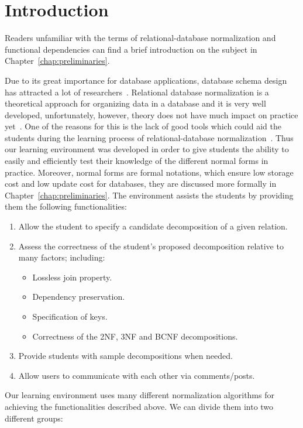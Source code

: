 \chapter{Introduction}
\label{chap:introduction}
Readers unfamiliar with the terms of relational-database normalization and 
functional dependencies can find a brief introduction on the subject in
Chapter~\ref{chap:preliminaries}. 

Due to its great importance for database applications, database schema design has
attracted a lot of researchers~\cite{p1}. Relational database normalization is a 
theoretical approach for organizing data in a database and it is very well developed, 
unfortunately, however, theory does not have much impact on practice yet~\cite{p1}.
One of the reasons for this is the lack of good tools which could aid the students 
during the learning process of relational-database normalization~\cite{p8}. 
Thus our learning environment was developed in order to give students the ability to 
easily and efficiently test
their knowledge of the different normal forms in practice. Moreover, normal forms are formal
notations, which ensure low storage cost and low update cost for databases, they are discussed
more formally in Chapter~\ref{chap:preliminaries}. The environment assists the students by 
providing them the following functionalities:

\begin{enumerate}
	\item Allow the student to specify a candidate decomposition of a given relation.
	\item Assess the correctness of the student's proposed decomposition relative to many factors; including:
		\begin{itemize}
			\item Lossless join property.
			\item Dependency preservation.
			\item Specification of keys.
			\item Correctness of the 2NF, 3NF and BCNF decompositions.
		\end{itemize}
	\item Provide students with sample decompositions when needed. 
	\item Allow users to communicate with each other via comments/posts.
\end{enumerate}

Our learning environment uses many different normalization 
algorithms for achieving the functionalities described above. 
We can divide them into two different groups:

